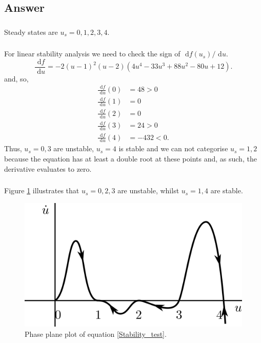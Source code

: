 \documentclass[]{article}
\newcommand{\bb}{\begin{equation}}
\newcommand{\ee}{\end{equation}}
\newcommand{\rd}{\text{ d}}
\newcommand{\fig}[1]{Figure \ref{#1}}
\newcommand{\eqn}[1]{equation \eqref{#1}}
\newcommand{\ttp}{.45\textwidth}
\begin{document}
\begin{Answ}
\subsection{Answer}
\subsubsection{}
Steady states are $u_s=0,1,2,3,4$.
\subsubsection{}
For linear stability analysis we need to check the sign of $\rd f(u_s)/\rd u$.
\bb
\frac{\rd f}{\rd u}=-2(u-1)^2(u-2)(4u^4-33u^3+88u^2-80u+12).
\ee
and, so,
\begin{align}
\frac{\rd f}{\rd u}(0)&=48>0\nonumber\\
\frac{\rd f}{\rd u}(1)&=0\nonumber\\
\frac{\rd f}{\rd u}(2)&=0\nonumber\\
\frac{\rd f}{\rd u}(3)&=24>0\nonumber\\
\frac{\rd f}{\rd u}(4)&=-432<0\nonumber.
\end{align}
Thus, $u_s=0,3$ are unstable, $u_s=4$ is stable and we can not categorise $u_s=1,2$ because the equation has at least a double root at these points and, as such, the derivative evaluates to zero.
\subsubsection{}
\fig{Revision_stability_one_variable} illustrates that $u_s=0,2,3$ are unstable, whilst $u_s=1,4$ are stable.
\begin{figure}[h!!!tb]
\centering
\includegraphics[width=\ttp]{../../Pictures/Revision_stability_one_variable.png}
\caption{\label{Revision_stability_one_variable} Phase plane plot of \eqn{Stability_test}.}
\end{figure}
\end{Answ}
\end{document}
